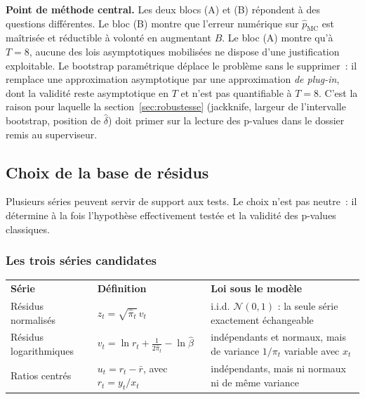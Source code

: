 \documentclass[a4paper,11pt]{article}
\begin{document}
\medskip
\begin{encadre}
\textbf{Point de méthode central.} Les deux blocs (A) et (B) répondent à des
questions différentes. Le bloc (B) montre que l'erreur numérique sur
$\hat p_{\text{MC}}$ est maîtrisée et réductible à volonté en augmentant $B$. Le
bloc (A) montre qu'à $T = 8$, aucune des lois asymptotiques mobilisées ne
dispose d'une justification exploitable. Le bootstrap paramétrique déplace le
problème sans le supprimer~: il remplace une approximation asymptotique par une
approximation \emph{de plug-in}, dont la validité reste asymptotique en $T$ et
n'est pas quantifiable à $T = 8$. C'est la raison pour laquelle la
section~\ref{sec:robustesse} (jackknife, largeur de l'intervalle bootstrap,
position de $\hat\delta$) doit primer sur la lecture des p-values dans le
dossier remis au superviseur.
\end{encadre}

\subsection{Choix de la base de résidus}
\label{sec:base-residus}

Plusieurs séries peuvent servir de support aux tests. Le choix n'est pas neutre~:
il détermine à la fois l'hypothèse effectivement testée et la validité des
p-values classiques.

\subsubsection*{Les trois séries candidates}

\begin{center}
\small
{}
\begin{tabular}{@{}p{2.6cm}p{4.6cm}p{7.6cm}@{}}
\rowcolor{tableheader}
\textcolor{financeblue}{\textbf{Série}} &
\textcolor{financeblue}{\textbf{Définition}} &
\textcolor{financeblue}{\textbf{Loi sous le modèle}} \\
Résidus normalisés & $z_t = \sqrt{\hat\pi_t}\,v_t$ &
i.i.d. $\mathcal{N}(0,1)$ : la seule série exactement échangeable \\
Résidus logarithmiques & $v_t = \ln r_t + \tfrac{1}{2\hat\pi_t} - \ln\hat\beta$ &
indépendants et normaux, mais de variance $1/\pi_t$ variable avec $x_t$ \\
Ratios centrés & $u_t = r_t - \bar r$, avec $r_t = y_t/x_t$ &
indépendants, mais ni normaux ni de même variance \\
\end{tabular}
\end{center}
\end{document}
